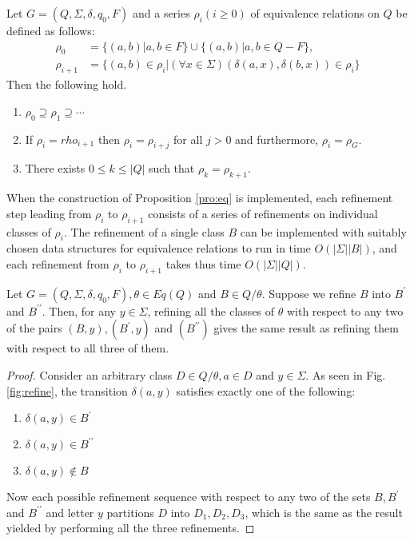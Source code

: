 \begin{proposition} \label{pro:eq}
	Let $G=(Q,\Sigma,\delta,q_0,F)$ and a series $\rho_i (i\ge 0)$ of equivalence relations on $Q$ be defined as follows:
	\begin{align*}
	\rho_0 &=\{(a,b)|a,b\in F \} \cup \{(a,b)|a,b\in Q-F \},\\
	\rho_{i+1} &=\{(a,b)\in\rho_i|(\forall x\in \Sigma) (\delta(a,x),\delta(b,x))\in\rho_i \}
	\end{align*}
	Then the following hold.
	\begin{enumerate} [(1) ]
		\item $\rho_0\supseteq\rho_1\supseteq\cdots$
		\item If $\rho_i=rho_{i+1}$ then $\rho_i=\rho_{i+j}$ for all $j>0$ and furthermore, $\rho_i=\rho_G$.
		\item There exists $0\le k\le |Q|$ such that $\rho_k=\rho_{k+1}$. 
	\end{enumerate}
\end{proposition}

When the construction of Proposition \ref{pro:eq} is implemented, each refinement step leading from $\rho_i$ to $\rho_{i+1}$ consists of a series of refinements on individual classes of $\rho_i$. The refinement of a single class $B$ can be implemented with suitably chosen data structures for equivalence relations to run in time $O(|\Sigma||B|)$, and each refinement from $\rho_i$ to $\rho_{i+1}$
takes thus time $O(|\Sigma||Q|)$.

\begin{lemma} \label{lemma:refine}
	Let $G=(Q,\Sigma,\delta,q_0,F),\theta\in Eq(Q)$ and $B\in Q/\theta$. Suppose we refine $B$ into $B^\prime$ and $B^{\prime\prime}$. Then, for any $y\in\Sigma$, refining all the classes of $\theta$ with respect to any two of the pairs $(B,y),(B^\prime,y)$ and $(B^{\prime\prime})$ gives the same result as refining them with respect to all three of them.
\end{lemma}

\begin{proof}
	Consider an arbitrary class $D\in Q/\theta, a\in D$ and $y\in\Sigma$. As seen in Fig. \ref{fig:refine}, the transition $\delta(a,y)$ satisfies exactly one of the following: 
	\begin{enumerate}[(1) ]
		\item $\delta(a,y)\in B^\prime$
		\item $\delta(a,y)\in B^{\prime\prime}$
		\item $\delta(a,y)\notin B$
	\end{enumerate}
	Now each possible refinement sequence with respect to any two of the sets $B,B^\prime$ and $B^{\prime\prime}$ and letter $y$ partitions $D$ into $D_1,D_2,D_3$, which is the same as the result yielded by performing all the three refinements.
\end{proof}

